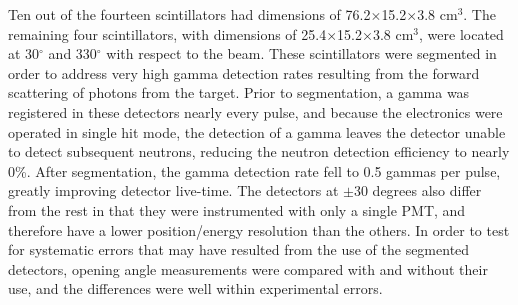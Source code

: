 Ten out of the fourteen scintillators had dimensions of 76.2$\times$15.2$\times$3.8 cm$^3$.
The remaining four scintillators, with dimensions of 25.4$\times$15.2$\times$3.8 cm$^3$, were located at 30$^{\circ}$ and 330$^{\circ}$ with respect to the beam.
These scintillators were segmented in order to address very high gamma detection rates resulting from the forward scattering of photons from the target.
Prior to segmentation, a gamma was registered in these detectors nearly every pulse, and because the electronics were operated in single hit mode, the detection of a gamma leaves the detector unable to detect subsequent neutrons, reducing the neutron detection efficiency to nearly 0\%.
After segmentation, the gamma detection rate fell to 0.5 gammas per pulse, greatly improving detector live-time.
The detectors at $\pm$30 degrees also differ from the rest in that they were instrumented with only a single PMT, and therefore have a lower position/energy resolution than the others.
In order to test for systematic errors that may have resulted from the use of the segmented detectors, opening angle measurements were compared with and without their use, and the differences were well within experimental errors.

